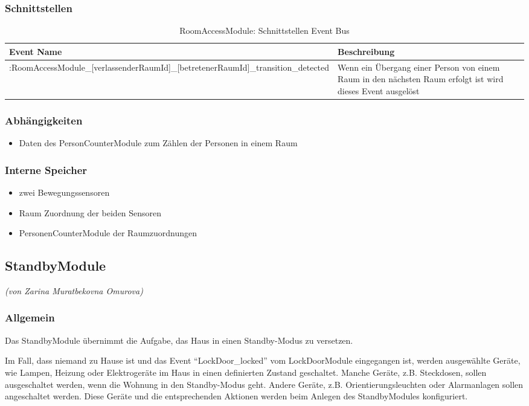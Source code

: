 \subsubsection{Schnittstellen}
\begin{table}[H]
	\begin{tabularx}{\textwidth}{
			>{\hsize=1.25\hsize}X 
			>{\hsize=0.75\hsize}X
		}
		\hline
		\textbf{Event Name}						& \textbf{Beschreibung} \\
		\hline [DeviceId]:RoomAccessModule\_[verlassenderRaumId]\_[betretenerRaumId]\_transition\_detected	& Wenn ein Übergang einer Person von einem Raum in den nächsten 	Raum erfolgt ist wird dieses Event ausgelöst \\ 
		\hline 
	\end{tabularx}
	\caption{RoomAccessModule: Schnittstellen Event Bus}
\end{table}

\subsubsection{Abhängigkeiten}
\begin{itemize}
	\item Daten des PersonCounterModule zum Zählen der Personen in einem Raum
\end{itemize}

\subsubsection{Interne Speicher}
\begin{itemize}
	\item zwei Bewegungssensoren
	\item Raum Zuordnung der beiden Sensoren
	\item PersonenCounterModule der Raumzuordnungen
\end{itemize}


\subsection{StandbyModule}
\emph{(von Zarina Muratbekovna Omurova)}
\subsubsection{Allgemein}
Das StandbyModule übernimmt die Aufgabe, das Haus in einen Standby-Modus zu versetzen.

Im Fall, dass niemand zu Hause ist und das Event "`LockDoor\_locked"' vom LockDoorModule eingegangen ist, werden ausgewählte Geräte, wie Lampen, Heizung oder Elektrogeräte im Haus in einen definierten Zustand geschaltet. Manche Geräte, z.B. Steckdosen, sollen ausgeschaltet werden, wenn die Wohnung in den Standby-Modus geht. Andere Geräte, z.B. Orientierungsleuchten oder Alarmanlagen sollen angeschaltet werden. Diese Geräte und die entsprechenden Aktionen werden beim Anlegen des StandbyModules konfiguriert.

